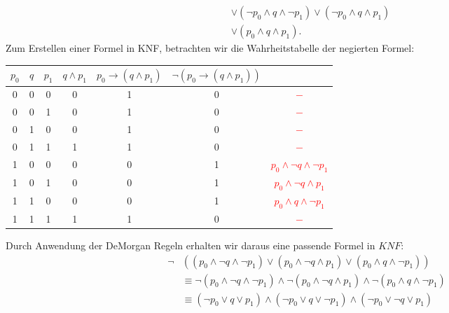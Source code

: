 \begin{example}
\begin{align*}
       &\lor (\neg p_0 \land      q\land \neg p_1)
       \lor (\neg p_0 \land      q\land      p_1)\\
       &\lor      (p_0 \land      q\land      p_1).
    \end{align*}
    Zum Erstellen einer Formel in KNF, betrachten wir die Wahrheitstabelle der negierten Formel:
    \begin{center}
        \begin{tabular} {| c | c | c || c | c | c | c |}
            \hline
            $p_0$ & $q$ & $p_1$ & $q\land p_1$ & $p_0\to (q\land p_1)$ & $\neg(p_0\to (q\land p_1))$ & \\
            \hline
            0 & 0 & 0 & 0 & 1 & 0 & \textcolor{red}{$-$}\\
            0 & 0 & 1 & 0 & 1 & 0 & \textcolor{red}{$-$}\\
            0 & 1 & 0 & 0 & 1 & 0 & \textcolor{red}{$-$}\\
            0 & 1 & 1 & 1 & 1 & 0 & \textcolor{red}{$-$}\\
            1 & 0 & 0 & 0 & 0 & 1 & \textcolor{red}{$p_0 \land \neg q\land \neg p_1$}\\
            1 & 0 & 1 & 0 & 0 & 1 & \textcolor{red}{$p_0 \land \neg q\land      p_1$}\\
            1 & 1 & 0 & 0 & 0 & 1 & \textcolor{red}{$p_0 \land q\land \neg p_1$}\\
            1 & 1 & 1 & 1 & 1 & 0 & \textcolor{red}{$-$}\\
            \hline
        \end{tabular}
    \end{center}
    \smallskip
    Durch Anwendung der DeMorgan Regeln erhalten wir daraus eine passende Formel in $KNF$:
    \begin{align*}
        \neg&((p_0 \land \neg q\land \neg p_1)\lor
              (p_0 \land \neg q\land p_1)\lor
              (p_0 \land q\land \neg p_1)
            )\\
            &\equiv
              \neg(p_0 \land \neg q\land \neg p_1)\land
              \neg(p_0 \land \neg q\land p_1)\land
              \neg(p_0 \land q\land \neg p_1)\\
            &\equiv
              (\neg p_0 \lor q\lor p_1)\land
              (\neg p_0 \lor q\lor \neg p_1)\land
              (\neg p_0 \lor \neg q\lor p_1)
    \end{align*}
\end{example}